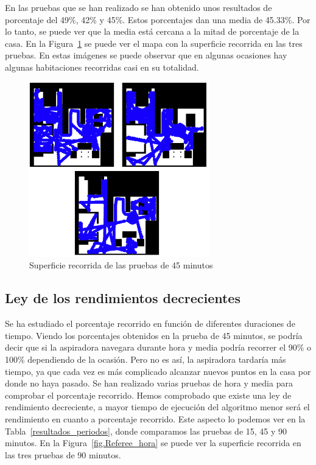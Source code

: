 En las pruebas que se han realizado se han obtenido unos resultados de porcentaje del 49\%, 42\% y 45\%. Estos porcentajes dan una media de 45.33\%. Por lo tanto, se puede ver que la media está cercana a la mitad de porcentaje de la casa. En la Figura~\ref{fig.Referee_45MIN} se puede ver el mapa con la superficie recorrida en las tres pruebas. En estas imágenes se puede observar que en algunas ocasiones hay algunas habitaciones recorridas casi en su totalidad.\\

\begin{figure}[H]
  \begin{center}
    \includegraphics[width=0.7\textwidth]{figures/Vacuum/Referee_45MIN.png}
		\caption{Superficie recorrida de las pruebas de 45 minutos}
		\label{fig.Referee_45MIN}
		\end{center}
\end{figure}

\subsection{Ley de los rendimientos decrecientes}

Se ha estudiado el porcentaje recorrido en función de diferentes duraciones de tiempo. Viendo los porcentajes obtenidos en la prueba de 45 minutos, se podría decir que si la aspiradora navegara durante hora y media podría recorrer el 90\% o 100\% dependiendo de la ocasión. Pero no es así, la aspiradora tardaría más tiempo, ya que cada vez es más complicado alcanzar nuevos puntos en la casa por donde no haya pasado. Se han realizado varias pruebas de hora y media para comprobar el porcentaje recorrido. Hemos comprobado que existe una ley de rendimiento decreciente, a mayor tiempo de ejecución del algoritmo menor será el rendimiento en cuanto a porcentaje recorrido. Este aspecto lo podemos ver en la Tabla~\ref{resultados_periodos}, donde comparamos las pruebas de 15, 45 y 90 minutos. En la Figura~\ref{fig.Referee_hora} se puede ver la superficie recorrida en las tres pruebas de 90 minutos.\\

